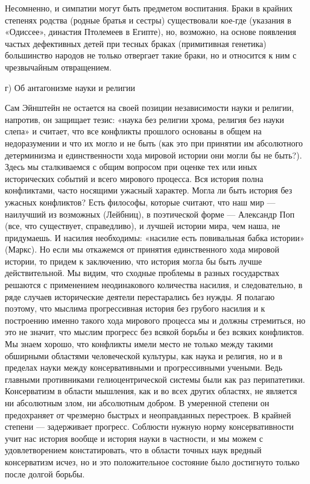 Несомненно, и симпатии могут быть предметом воспитания. Браки в крайних
степенях родства (родные братья и сестры) существовали кое-где (указания в
«Одиссее», династия Птолемеев в Египте), но, возможно, на основе появления
частых дефективных детей при тесных браках (примитивная генетика) большинство
народов не только отвергает такие браки, но и относится к ним с чрезвычайным
отвращением.

г) Об антагонизме науки и религии

Сам Эйнштейн не остается на своей позиции независимости науки и религии,
напротив, он защищает тезис: «наука без религии хрома, религия без науки слепа»
и считает, что все конфликты прошлого основаны в общем на недоразумении и что
их могло и не быть (как это при принятии им абсолютного детерминизма и
единственности хода мировой истории они могли бы не быть?). Здесь мы
сталкиваемся с общим вопросом при оценке тех или иных исторических событий и
всего мирового процесса. Вся история полна конфликтами, часто носящими ужасный
характер. Могла ли быть история без ужасных конфликтов? Есть философы, которые
считают, что наш мир --- наилучший из возможных (Лейбниц), в поэтической форме ---
Александр Поп (все, что существует, справедливо), и лучшей истории мира, чем
наша, не придумаешь. И насилия необходимы: «насилие есть повивальная бабка
истории» (Маркс). Но если мы откажемся от принятия единственного хода мировой
истории, то придем к заключению, что история могла бы быть лучше
действительной. Мы видим, что сходные проблемы в разных государствах решаются с
применением неодинакового количества насилия, и следовательно, в ряде случаев
исторические деятели перестарались без нужды. Я полагаю поэтому, что мыслима
прогрессивная история без грубого насилия и к построению именно такого хода
мирового процесса мы и должны стремиться, но это не значит, что мыслим прогресс
без всякой борьбы и без всяких конфликтов. Мы знаем хорошо, что конфликты имели
место не только между такими обширными областями человеческой культуры, как
наука и религия, но и в пределах науки между консервативными и прогрессивными
учеными. Ведь главными противниками гелиоцентрической системы были как раз
перипатетики. Консерватизм в области мышления, как и во всех других областях,
не является ни абсолютным злом, ни абсолютным добром. В умеренной степени он
предохраняет
от чрезмерно быстрых и неоправданных перестроек. В крайней степени ---
задерживает прогресс. Соблюсти нужную норму консервативности учит нас история
вообще и история науки в частности, и мы можем с удовлетворением
констатировать, что в области точных наук вредный консерватизм исчез, но и это
положительное состояние было достигнуто только после долгой борьбы.

